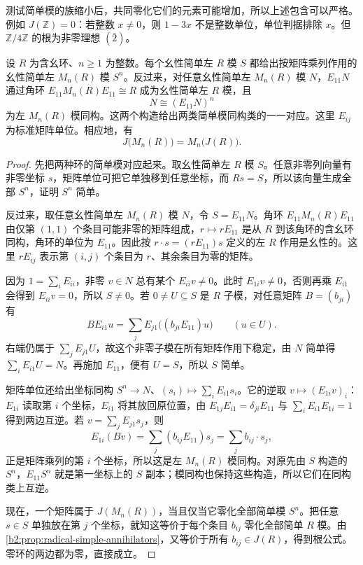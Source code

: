 测试简单模的族缩小后，共同零化它们的元素可能增加，所以上述包含可以严格。例如 \(J(\mathbb Z)=0\)：若整数 \(x\ne0\)，则 \(1-3x\) 不是整数单位，单位判据排除 \(x\)。但 \(\mathbb Z/4\mathbb Z\) 的根为非零理想 \((\bar2)\)。

\begin{proposition}\label{b2:prop:matrix-radical}
	设 \(R\) 为含幺环、\(n\ge1\) 为整数。每个幺性简单左 \(R\) 模 \(S\) 都给出按矩阵乘列作用的幺性简单左 \(M_n(R)\) 模 \(S^n\)。反过来，对任意幺性简单左 \(M_n(R)\) 模 \(N\)，\(E_{11}N\) 通过角环 \(E_{11}M_n(R)E_{11}\cong R\) 成为幺性简单左 \(R\) 模，且
	\[
		N\cong(E_{11}N)^n
	\]
	为左 \(M_n(R)\) 模同构。这两个构造给出两类简单模同构类的一一对应。这里 \(E_{ij}\) 为标准矩阵单位。相应地，有
	\[
		J\bigl(M_n(R)\bigr)=M_n\bigl(J(R)\bigr).
	\]
\end{proposition}
\begin{proof}
	先把两种环的简单模对应起来。取幺性简单左 \(R\) 模 \(S\)。任意非零列向量有非零坐标 \(s\)，矩阵单位可把它单独移到任意坐标，而 \(Rs=S\)，所以该向量生成全部 \(S^n\)，证明 \(S^n\) 简单。

	反过来，取任意幺性简单左 \(M_n(R)\) 模 \(N\)，令 \(S=E_{11}N\)。角环 \(E_{11}M_n(R)E_{11}\) 由仅第 \((1,1)\) 个条目可能非零的矩阵组成，\(r\mapsto rE_{11}\) 是从 \(R\) 到该角环的含幺环同构，角环的单位为 \(E_{11}\)。因此按 \(r\cdot s=(rE_{11})s\) 定义的左 \(R\) 作用是幺性的。这里 \(rE_{ij}\) 表示第 \((i,j)\) 个条目为 \(r\)、其余条目为零的矩阵。

	因为 \(1=\sum_iE_{ii}\)，非零 \(v\in N\) 总有某个 \(E_{ii}v\ne0\)。此时 \(E_{1i}v\ne0\)，否则再乘 \(E_{i1}\) 会得到 \(E_{ii}v=0\)，所以 \(S\ne0\)。若 \(0\ne U\subseteq S\) 是 \(R\) 子模，对任意矩阵 \(B=(b_{ji})\) 有
	\[
		B E_{i1}u=\sum_j E_{j1}\bigl((b_{ji}E_{11})u\bigr) \qquad(u\in U).
	\]
	右端仍属于 \(\sum_jE_{j1}U\)，故这个非零子模在所有矩阵作用下稳定，由 \(N\) 简单得 \(\sum_iE_{i1}U=N\)。再施加 \(E_{11}\)，便有 \(U=S\)，所以 \(S\) 简单。

	矩阵单位还给出坐标同构 \(S^n\to N\)、\((s_i)\mapsto\sum_iE_{i1}s_i\)。它的逆取 \(v\mapsto(E_{1i}v)_i\)：\(E_{1i}\) 读取第 \(i\) 个坐标，\(E_{i1}\) 将其放回原位置，由 \(E_{1j}E_{i1}=\delta_{ji}E_{11}\) 与 \(\sum_iE_{i1}E_{1i}=1\) 得到两边互逆。若 \(v=\sum_jE_{j1}s_j\)，则
	\[
		E_{1i}(Bv)=\sum_j(b_{ij}E_{11})s_j=\sum_j b_{ij}\cdot s_j,
	\]
	正是矩阵乘列的第 \(i\) 个坐标，所以这是左 \(M_n(R)\) 模同构。对原先由 \(S\) 构造的 \(S^n\)，\(E_{11}S^n\) 就是第一坐标上的 \(S\) 副本；模同构也保持这些构造，所以它们在同构类上互逆。

	现在，一个矩阵属于 \(J(M_n(R))\)，当且仅当它零化全部简单模 \(S^n\)。把任意 \(s\in S\) 单独放在第 \(j\) 个坐标，就知这等价于每个条目 \(b_{ij}\) 零化全部简单 \(R\) 模。由\cref{b2:prop:radical-simple-annihilators}，又等价于所有 \(b_{ij}\in J(R)\)，得到根公式。零环的两边都为零，直接成立。
\end{proof}

